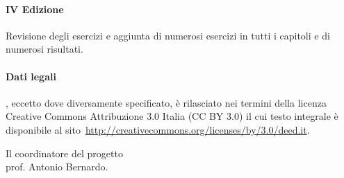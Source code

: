 \paragraph{IV Edizione}
Revisione degli esercizi e aggiunta di numerosi esercizi in tutti i capitoli e di numerosi risultati.

\paragraph{Dati legali} \serie, eccetto dove diversamente specificato, è rilasciato nei termini 
della licenza Creative Commons Attribuzione 3.0 Italia
(CC BY 3.0) il cui testo integrale è disponibile al 
sito~\url{http://creativecommons.org/licenses/by/3.0/deed.it}.


\begin{flushright}
Il coordinatore del progetto\\
prof. Antonio Bernardo.
\end{flushright}

\cleardoublepage
